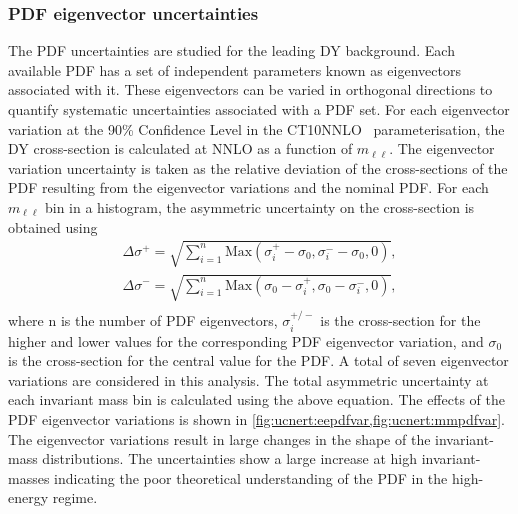\subsubsection{PDF eigenvector uncertainties}
The PDF uncertainties are studied for the leading DY background. Each available PDF has a set of independent parameters known as eigenvectors associated with it. These eigenvectors can be varied in orthogonal directions to quantify systematic uncertainties associated with a PDF set. For each eigenvector variation at the 90\% Confidence Level in the CT10NNLO~\cite{ct10} parameterisation, the DY cross-section is calculated at NNLO as a function of $m_{\ell\ell}$. The eigenvector variation uncertainty is taken as the relative deviation of the cross-sections of the PDF resulting from the eigenvector variations and the nominal PDF. For each $m_{\ell\ell}$ bin in a histogram, the asymmetric uncertainty on the cross-section is obtained using
\begin{equation}
    \begin{aligned}
    \Delta \sigma^+ = \sqrt{\sum^n_{i=1}\mathrm{Max}\left(\sigma_i^+ - \sigma_0, \sigma^-_i - \sigma_0,0     \right)}, \\
    \Delta \sigma^- = \sqrt{\sum^n_{i=1}\mathrm{Max}\left(\sigma_0 - \sigma_i^+, \sigma_0 -\sigma^-_i,0  \right)}, \\
    \end{aligned}
\end{equation}
where n is the number of PDF eigenvectors, $\sigma_i^{+/-}$ is the cross-section for the higher and lower values for the corresponding PDF eigenvector variation, and $\sigma_0$ is the cross-section for the central value for the PDF. A total of seven eigenvector variations are considered in this analysis. The total asymmetric uncertainty at each invariant mass bin is calculated using the above equation. The effects of the PDF eigenvector variations is shown in \cref{fig:ucnert:eepdfvar,fig:ucnert:mmpdfvar}. The eigenvector variations result in large changes in the shape of the invariant-mass distributions. The uncertainties show a large increase at high invariant-masses indicating the poor theoretical understanding of the PDF in the high-energy regime.

